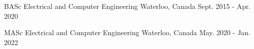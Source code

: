 



\begin{cvhonors}


\cvhonor
{BASc} %
{Electrical and Computer Engineering} %
{Waterloo, Canada} %
{Sept. 2015 - Apr. 2020} %


\cvhonor
{MASc} %
{Electrical and Computer Engineering} %
{Waterloo, Canada} %
{May. 2020 - Jan. 2022} %

\end{cvhonors}